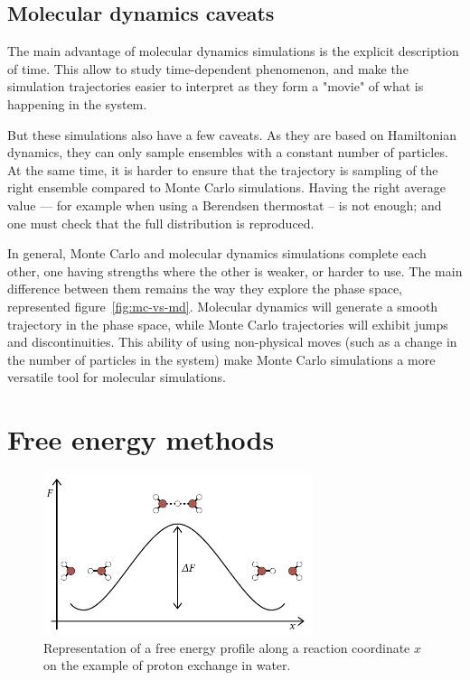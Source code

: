 \documentclass[thesis]{subfiles}
\begin{document}
\subsection{Molecular dynamics caveats}

The main advantage of molecular dynamics simulations is the explicit description
of time. This allow to study time-dependent phenomenon, and make the simulation
trajectories easier to interpret as they form a "movie" of what is happening in
the system.

But these simulations also have a few caveats. As they are based on Hamiltonian
dynamics, they can only sample ensembles with a constant number of particles.
At the same time, it is harder to ensure that the trajectory is sampling of the
right ensemble compared to Monte Carlo simulations. Having the right average
value --- for example when using a Berendsen thermostat -- is not enough; and
one must check that the full distribution is reproduced.

In general, Monte Carlo and molecular dynamics simulations complete each other,
one having strengths where the other is weaker, or harder to use. The main
difference between them remains the way they explore the phase space,
represented figure~\ref{fig:mc-vs-md}. Molecular dynamics will generate a smooth
trajectory in the phase space, while Monte Carlo trajectories will exhibit jumps
and discontinuities. This ability of using non-physical moves (such as a change
in the number of particles in the system) make Monte Carlo simulations a more
versatile tool for molecular simulations.

\newpage
\section{Free energy methods}

\begin{figure}[ht]
    \centering
    \includegraphics[width=0.7\textwidth]{figures/images/free-energy-profile}
    \caption{Representation of a free energy profile along a reaction
    coordinate $x$ on the example of proton exchange in water.}
    \label{fig:free-energy-profile}
\end{figure}
\end{document}
